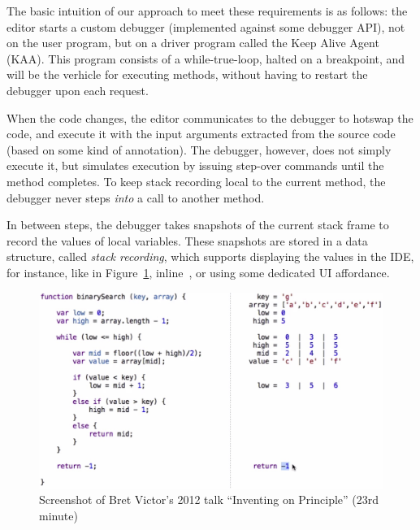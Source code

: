 \documentclass[english,submission]{programming}
\begin{document}
The basic intuition of our approach to meet these requirements is as follows: the editor starts a custom debugger (implemented against some debugger API), not on the user program, but on a driver program called the Keep Alive Agent (KAA). This program consists of a while-true-loop, halted on a breakpoint, and will be the verhicle for executing methods, without having to restart the debugger upon each request. 

When the code changes, the editor communicates to the debugger to hotswap the code, and execute it with the input arguments extracted from the source code (based on some kind of annotation). The debugger, however, does not simply execute it, but simulates execution by issuing step-over commands until the method completes. To keep stack recording local to the current method, the debugger never steps \textit{into} a call to another method.

In between steps, the debugger takes snapshots of the current stack frame to record the values of local variables.  These snapshots are stored in a data structure, called \textit{stack recording}, which supports displaying the values in the IDE, for instance, like in Figure~\ref{FIG:bret}, inline~\cite{LiveLiterals,ExampleBasedGraalVM}, or using some dedicated UI affordance. 

\begin{figure}[t]
  \centering
  \includegraphics[width=\textwidth]{img/bret}
  \caption{Screenshot of Bret Victor's 2012 talk ``Inventing on Principle'' (23rd minute)~\cite{InventingOnPrinciple}}
  \label{FIG:bret}
\end{figure}
\end{document}

